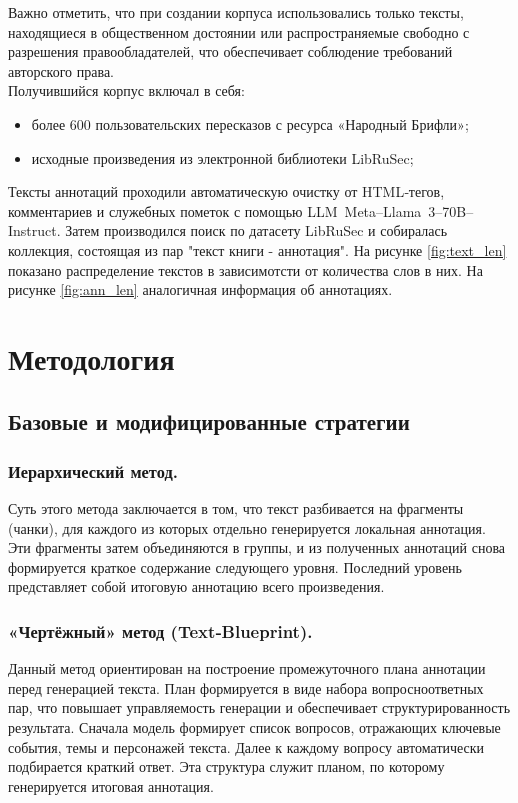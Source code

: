 \documentclass{article}
\theoremstyle{definition}
\theoremstyle{plain}
\begin{document}
Важно отметить, что при создании корпуса использовались только тексты, находящиеся в общественном достоянии или распространяемые свободно с разрешения правообладателей, что обеспечивает соблюдение требований авторского права.
\\Получившийся корпус включал в себя:
\begin{itemize}
  \item более 600 пользовательских пересказов с ресурса «Народный Брифли»;
  \item исходные произведения из электронной библиотеки LibRuSec;
\end{itemize}
Тексты аннотаций проходили автоматическую очистку от HTML‑тегов, комментариев и служебных пометок с помощью LLM~Meta--Llama~3--70B--Instruct. Затем производился поиск по датасету LibRuSec и собиралась коллекция, состоящая из пар "текст книги - аннотация".
На рисунке \ref{fig:text_len} показано распределение текстов в зависимотсти от количества слов в них. На рисунке \ref{fig:ann_len} аналогичная информация об аннотациях.

\section*{Методология}

\subsection*{Базовые и модифицированные стратегии}

\subsubsection*{Иерархический метод.}
Суть этого метода \cite{hierarchical} заключается в том, что текст разбивается на фрагменты (чанки), для каждого из
которых отдельно генерируется локальная аннотация. 
Эти фрагменты затем объединяются в группы, и из полученных аннотаций снова формируется краткое содержание
следующего уровня. Последний уровень представляет собой итоговую аннотацию всего произведения.

\subsubsection*{«Чертёжный» метод (Text‑Blueprint).}
Данный метод \cite{blueprint} ориентирован на построение промежуточного
плана аннотации перед генерацией текста. План формируется в виде набора вопросноответных пар, что повышает управляемость генерации и обеспечивает структурированность результата.
Сначала модель формирует список вопросов, отражающих ключевые события, темы
и персонажей текста. Далее к каждому вопросу автоматически подбирается краткий
ответ. Эта структура служит планом, по которому генерируется итоговая аннотация.
\end{document}

